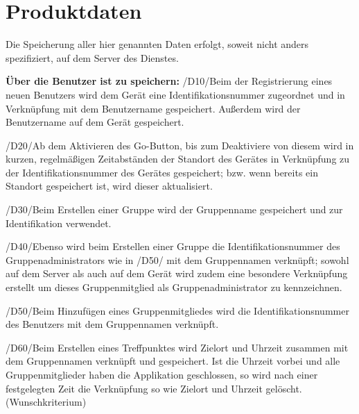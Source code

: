 \section{Produktdaten}

Die Speicherung aller hier genannten Daten erfolgt, soweit nicht anders spezifiziert, auf dem Server des Dienstes.

\textbf{Über die Benutzer ist zu speichern:}
/D10/Beim der Registrierung eines neuen Benutzers wird dem Gerät eine Identifikationsnummer zugeordnet und in Verknüpfung mit dem Benutzername gespeichert. Außerdem wird der Benutzername auf dem Gerät gespeichert.

/D20/Ab dem Aktivieren des Go-Button, bis zum Deaktiviere von diesem wird in kurzen, regelmäßigen Zeitabständen der Standort des Gerätes in Verknüpfung zu der Identifikationsnummer des Gerätes gespeichert; bzw. wenn bereits ein Standort gespeichert ist, wird dieser aktualisiert.

/D30/Beim Erstellen einer Gruppe wird der Gruppenname gespeichert und zur Identifikation verwendet.

/D40/Ebenso wird beim Erstellen einer Gruppe die Identifikationsnummer des Gruppenadministrators wie in /D50/ mit dem Gruppennamen verknüpft; sowohl auf dem Server als auch auf dem Gerät wird zudem eine besondere Verknüpfung erstellt um dieses Gruppenmitglied als Gruppenadministrator zu kennzeichnen.

/D50/Beim Hinzufügen eines Gruppenmitgliedes wird die Identifikationsnummer des Benutzers mit dem Gruppennamen verknüpft.

/D60/Beim Erstellen eines Treffpunktes wird Zielort und Uhrzeit zusammen mit dem Gruppennamen verknüpft und gespeichert. Ist die Uhrzeit vorbei und alle Gruppenmitglieder haben die Applikation geschlossen, so wird nach einer festgelegten Zeit die Verknüpfung so wie Zielort und Uhrzeit gelöscht. (Wunschkriterium)